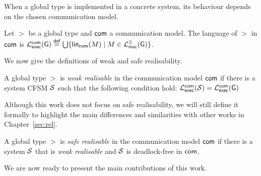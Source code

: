 
When a global type is implemented in a concrete system,
its behaviour depends on the chosen communication model.

\bigskip

\begin{definition}\label{def:global-type-language}
    Let $\gt$ be a global type and $\mathsf{com}$ a communication model. 
    The language of $\gt$ in $\mathsf{com}$ is $
    \mathcal{L}_{\mathsf{exec}}^{\mathsf{com}}(\mathsf{G})\stackrel{\mathsf{def}}{=}
    \bigcup\{\mathsf{lin}_{\mathsf{com}}(M)\mid M\in\mathcal{L}_{\mathsf{msc}}^{\exists}(\mathsf{G})\}$.
\end{definition}

We now give the definitions of weak and safe realisability.

\bigskip

\begin{definition}\label{def:gt-weak-realis}
A global type $\gt$ is \emph{weak realisable} in the
communication model $\mathsf{com}$ if there is a
system CFSM $\mathcal{S}$ such that the following condition hold:
$\mathcal{L}_{\mathsf{exec}}^{\mathsf{com}}(\mathcal{S}) = \mathcal{L}_{\mathsf{exec}}^{\mathsf{com}}(\mathsf{G})$
\end{definition}

Although this work does not focus on safe realisability, we will still
define it formally to highlight the main differences and similarities 
with other works in Chapter~\ref{sec:rel}.

\bigskip

\begin{definition}\label{def:gt-safe-realis}
    A global type $\gt$ is \emph{safe realisable}
    in the communication model $\mathsf{com}$
    if there is a system $\mathcal{S}$ that is \emph{weak realisable} and  
    $\mathcal{S}$ is deadlock-free in $\mathsf{com}$.
\end{definition}

We are now ready to present the main contributions of this work.